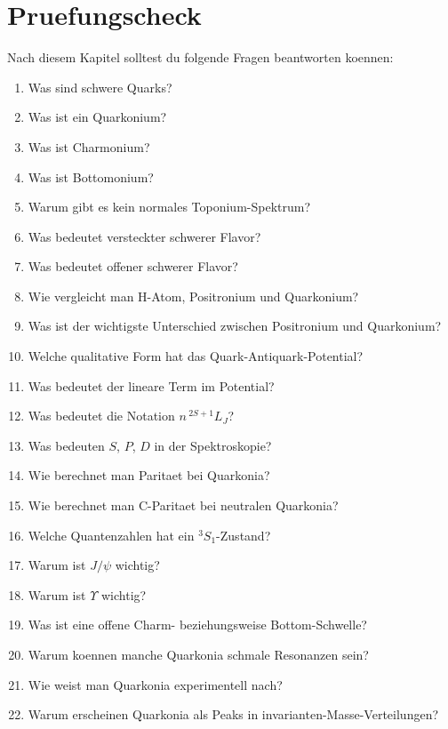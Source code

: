 \section{Pruefungscheck}

\begin{examtipbox}
Nach diesem Kapitel solltest du folgende Fragen beantworten koennen:
\begin{enumerate}
    \item Was sind schwere Quarks?
    \item Was ist ein Quarkonium?
    \item Was ist Charmonium?
    \item Was ist Bottomonium?
    \item Warum gibt es kein normales Toponium-Spektrum?
    \item Was bedeutet versteckter schwerer Flavor?
    \item Was bedeutet offener schwerer Flavor?
    \item Wie vergleicht man H-Atom, Positronium und Quarkonium?
    \item Was ist der wichtigste Unterschied zwischen Positronium und Quarkonium?
    \item Welche qualitative Form hat das Quark-Antiquark-Potential?
    \item Was bedeutet der lineare Term im Potential?
    \item Was bedeutet die Notation $n\,{}^{2S+1}L_J$?
    \item Was bedeuten $S$, $P$, $D$ in der Spektroskopie?
    \item Wie berechnet man Paritaet bei Quarkonia?
    \item Wie berechnet man C-Paritaet bei neutralen Quarkonia?
    \item Welche Quantenzahlen hat ein ${}^3S_1$-Zustand?
    \item Warum ist $J/\psi$ wichtig?
    \item Warum ist $\Upsilon$ wichtig?
    \item Was ist eine offene Charm- beziehungsweise Bottom-Schwelle?
    \item Warum koennen manche Quarkonia schmale Resonanzen sein?
    \item Wie weist man Quarkonia experimentell nach?
    \item Warum erscheinen Quarkonia als Peaks in invarianten-Masse-Verteilungen?
\end{enumerate}
\end{examtipbox}